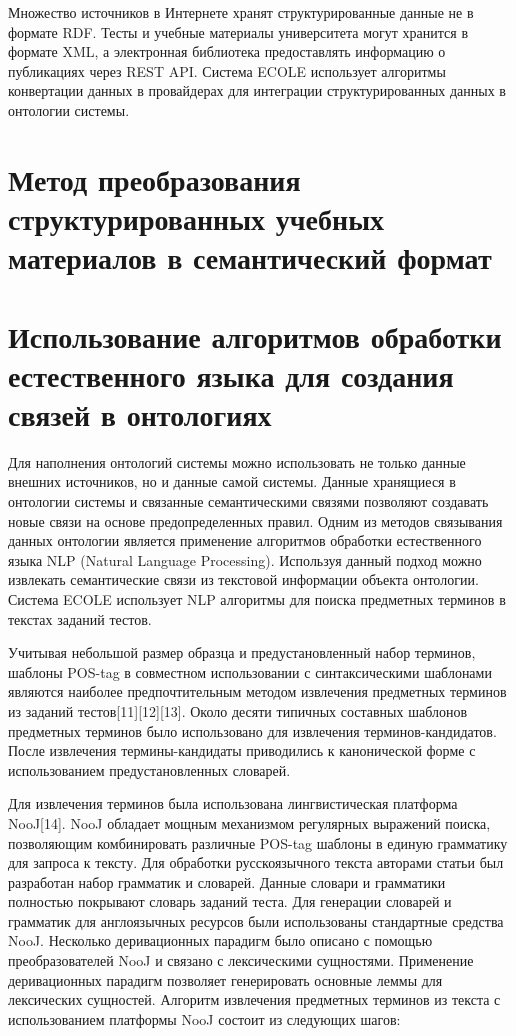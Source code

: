 Множество источников в Интернете хранят структурированные данные не в формате RDF. Тесты и учебные материалы университета могут хранится в формате XML, а электронная библиотека предоставлять информацию о публикациях через REST API. Система ECOLE использует алгоритмы конвертации данных в провайдерах для интеграции структурированных данных в онтологии системы.




\section{Метод преобразования структурированных учебных материалов в семантический формат} \label{sect3_2}




\section{Использование алгоритмов обработки естественного языка для создания связей в онтологиях} \label{sect3_3}

Для наполнения онтологий системы можно использовать не только данные внешних источников, но и данные самой системы. Данные хранящиеся в онтологии системы и связанные семантическими связями позволяют создавать новые связи на основе предопределенных правил. Одним из методов связывания данных онтологии является применение алгоритмов обработки естественного языка NLP (Natural Language Processing). Используя данный подход можно извлекать семантические связи из текстовой информации объекта онтологии. Система ECOLE использует NLP алгоритмы для поиска предметных терминов в текстах заданий тестов.

Учитывая небольшой размер образца и предустановленный набор терминов,  шаблоны POS-tag в совместном использовании с синтаксическими шаблонами являются наиболее предпочтительным методом извлечения предметных терминов из заданий тестов[11][12][13]. Около десяти типичных составных шаблонов предметных терминов было использовано для извлечения терминов-кандидатов.  После извлечения термины-кандидаты приводились к канонической форме с использованием предустановленных словарей.

Для извлечения терминов была использована лингвистическая платформа NooJ[14]. NooJ обладает мощным механизмом регулярных выражений поиска, позволяющим комбинировать различные POS-tag шаблоны в единую грамматику для запроса к тексту. Для обработки русскоязычного текста авторами статьи был разработан набор грамматик и словарей. Данные словари и грамматики полностью покрывают словарь заданий теста. Для генерации словарей и грамматик для англоязычных ресурсов были использованы стандартные средства NooJ. Несколько деривационных парадигм было описано с помощью преобразователей NooJ и связано с лексическими сущностями. Применение деривационных парадигм позволяет генерировать основные леммы для лексических сущностей. Алгоритм извлечения предметных терминов из текста с использованием платформы NooJ состоит из следующих шагов:

